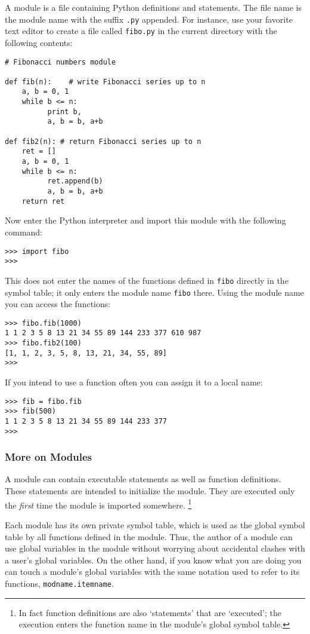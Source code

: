 A module is a file containing Python definitions and statements.
The file name is the module name with the suffix
{\tt .py}
appended.
For instance, use your favorite text editor to create a file called
{\tt fibo.py}
in the current directory with the following contents:
\bcode\begin{verbatim}
# Fibonacci numbers module

def fib(n):    # write Fibonacci series up to n
    a, b = 0, 1
    while b <= n:
          print b,
          a, b = b, a+b

def fib2(n): # return Fibonacci series up to n
    ret = []
    a, b = 0, 1
    while b <= n:
          ret.append(b)
          a, b = b, a+b
    return ret
\end{verbatim}\ecode
Now enter the Python interpreter and import this module with the
following command:
\bcode\begin{verbatim}
>>> import fibo
>>> 
\end{verbatim}\ecode
This does not enter the names of the functions defined in
{\tt fibo}
directly in the symbol table; it only enters the module name
{\tt fibo}
there.
Using the module name you can access the functions:
\bcode\begin{verbatim}
>>> fibo.fib(1000)
1 1 2 3 5 8 13 21 34 55 89 144 233 377 610 987
>>> fibo.fib2(100)
[1, 1, 2, 3, 5, 8, 13, 21, 34, 55, 89]
>>> 
\end{verbatim}\ecode
If you intend to use a function often you can assign it to a local name:
\bcode\begin{verbatim}
>>> fib = fibo.fib
>>> fib(500)
1 1 2 3 5 8 13 21 34 55 89 144 233 377
>>> 
\end{verbatim}\ecode

\subsubsection{More on Modules}

A module can contain executable statements as well as function
definitions.
These statements are intended to initialize the module.
They are executed only the
{\em first}
time the module is imported somewhere.%
\footnote{
	In fact function definitions are also `statements' that are
	`executed'; the execution enters the function name in the
	module's global symbol table.
}

Each module has its own private symbol table, which is used as the
global symbol table by all functions defined in the module.
Thus, the author of a module can use global variables in the module
without worrying about accidental clashes with a user's global
variables.
On the other hand, if you know what you are doing you can touch a
module's global variables with the same notation used to refer to its
functions,
{\tt modname.itemname}.


